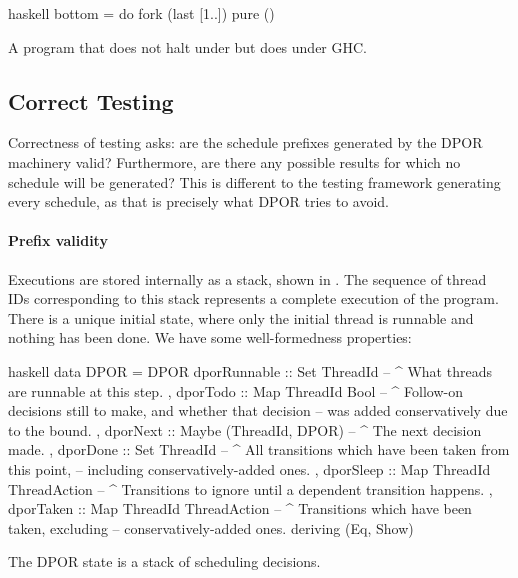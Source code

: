 \begin{listing}
\centering
\begin{cminted}{haskell}
bottom = do
  fork (last [1..])
  pure ()
\end{cminted}
\caption{A program that does not halt under \dejafu{} but does under GHC.}\label{lst:bottom}
\end{listing}

\subsection{Correct Testing}

Correctness of testing asks: are the schedule prefixes generated by
the DPOR machinery valid?  Furthermore, are there any possible results
for which no schedule will be generated?  This is different to the
testing framework generating every schedule, as that is precisely what
DPOR tries to avoid.

\paragraph{Prefix validity}
Executions are stored internally as a stack, shown in .
The sequence of thread IDs corresponding to this stack represents a
complete execution of the program.  There is a unique initial state,
where only the initial thread is runnable and nothing has been done.
We have some well-formedness properties:

\begin{listing}
\centering
\begin{cminted}{haskell}
data DPOR = DPOR
  { dporRunnable :: Set ThreadId
  -- ^ What threads are runnable at this step.
  , dporTodo     :: Map ThreadId Bool
  -- ^ Follow-on decisions still to make, and whether that decision
  -- was added conservatively due to the bound.
  , dporNext     :: Maybe (ThreadId, DPOR)
  -- ^ The next decision made.
  , dporDone     :: Set ThreadId
  -- ^ All transitions which have been taken from this point,
  -- including conservatively-added ones.
  , dporSleep    :: Map ThreadId ThreadAction
  -- ^ Transitions to ignore until a dependent transition happens.
  , dporTaken    :: Map ThreadId ThreadAction
  -- ^ Transitions which have been taken, excluding
  -- conservatively-added ones.
  } deriving (Eq, Show)
\end{cminted}
\caption{The DPOR state is a stack of scheduling decisions.}\label{lst:dpor}
\end{listing}

